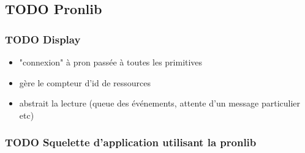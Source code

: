 

\subsection{TODO Pronlib}

\subsubsection{TODO Display}

\begin{itemize}
  \item "connexion" à pron passée à toutes les primitives
  \item gère le compteur d'id de ressources
  \item abstrait la lecture (queue des événements, attente d'un message particulier etc)
\end{itemize}

\subsubsection{TODO Squelette d'application utilisant la pronlib}
